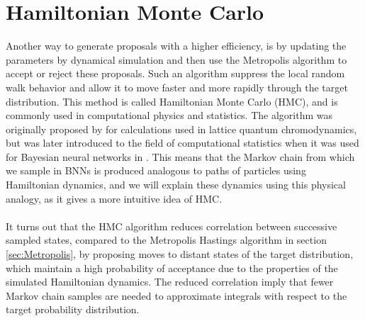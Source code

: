 \section{Hamiltonian Monte Carlo}\label{sec:HMC}
Another way to generate proposals with a higher efficiency, is by updating the parameters by dynamical simulation and then use the Metropolis algorithm to accept or reject these proposals. Such an algorithm suppress the local random walk behavior and allow it to move faster and more rapidly through the target distribution. This method is called Hamiltonian Monte Carlo (HMC), and is commonly used in computational physics and statistics. The algorithm was originally proposed by \cite{Duane1987216} for calculations used in lattice quantum chromodynamics, but was later introduced to the field of computational statistics when it was used for Bayesian neural networks in \cite{neal2012bayesian}. This means that the Markov chain from which we sample in BNNs is produced analogous to paths of particles using Hamiltonian dynamics, and we will explain these dynamics using this physical analogy, as it gives a more intuitive idea of HMC.
\\
\\
It turns out that the HMC algorithm reduces correlation between successive sampled states, compared to the Metropolis Hastings algorithm in section \ref{sec:Metropolis}, by proposing moves to distant states of the target distribution, which maintain a high probability of acceptance due to the properties of the simulated Hamiltonian dynamics. The reduced correlation imply that fewer Markov chain samples are needed to approximate integrals with respect to the target probability distribution.

